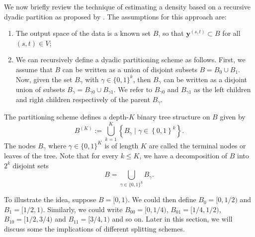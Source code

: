 \documentclass[a4paper, 11pt]{article}
\begin{document}
 We now briefly review the technique of estimating a density based on a recursive dyadic partition as proposed by \citet{tansey-etal-2017}. The assumptions for this approach are:
\begin{enumerate}[partopsep=0pt, itemsep=0pt]
    \item The output space of the data is a known set $B$, so that $\mathbf{y}^{(s,t)}\subset B$ for all $(s,t)\in V$;
    \item We can recursively define a dyadic partitioning scheme as follows. First, we assume that $B$ can be written as a union of disjoint subsets $B= B_0 \cup B_1$. Now, given the set $B_\gamma$ with $\gamma\in\{0,1\}^k$, then $B_\gamma$ can be written as a disjoint union of subsets $B_\gamma = B_{\gamma0} \cup B_{\gamma1}$. We refer to $B_{\gamma0}$ and $B_{\gamma1}$ as the left children and right children respectively of the parent $B_\gamma$.
\end{enumerate}
The partitioning scheme defines a depth-$K$ binary tree structure on $B$ given by
$$
B^{(K)} := \bigcup_{k=1}^K \left\{B_\gamma \mid \gamma \in \left\{0,1\right\}^k\right\}.
$$
The nodes $B_\gamma$ where $\gamma \in \{0,1\}^K$ is of length $K$ are called the terminal nodes or leaves of the tree. Note that for every $k \leq K$, we have a decomposition of $B$ into $2^k$ disjoint sets
$$
B = \bigcup_{\gamma\in\{0,1\}^k} B_\gamma.
$$

 To illustrate the idea, suppose $B=[0,1)$. We could then define $B_0 = [0,1/2)$ and $B_1=[1/2,1)$. Similarly, we could write $B_{00}=[0,1/4)$, $B_{01}=[1/4,1/2)$, $B_{10}=[1/2,3/4)$ and $B_{11}=[3/4,1)$ and so on. Later in this section, we will discuss some the implications of different splitting schemes. 
\end{document}
